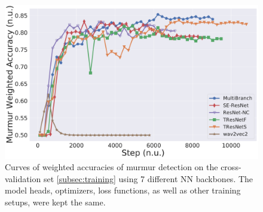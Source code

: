 
\begin{figure}[!htp]
\centering
\includegraphics[width=\linewidth]{images/compare_nn.pdf}
\caption{Curves of weighted accuracies of murmur detection on the cross-validation set \ref{subsec:training} using 7 different NN backbones. The model heads, optimizers, loss functions, as well as other training setups, were kept the same.}
\label{fig:compare_nn}
\end{figure}
